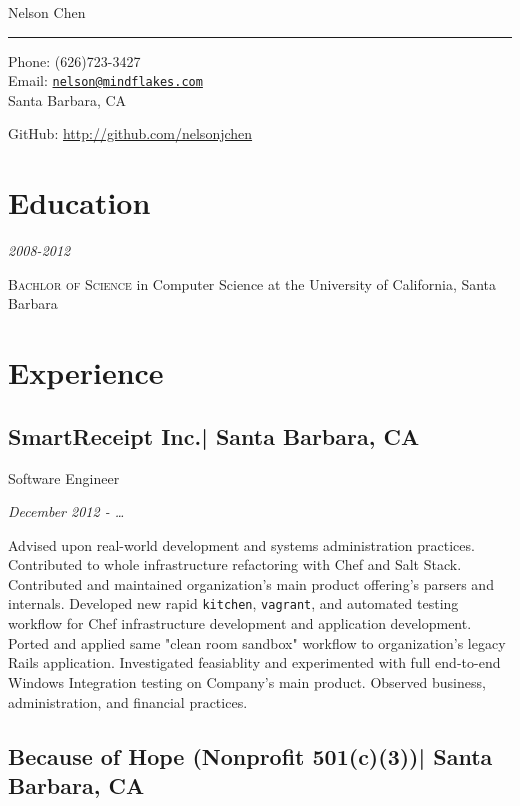 \documentclass[10pt, letter]{article}
\makeatletter
\def\myname{Nelson Chen}
\def\myemail{nelson@mindflakes.com}
\def\mycellphone{(626)723-3427}
\def\myaddress{Santa Barbara, CA}
\def\mygithub{nelsonjchen}
\newcommand{\years}[1]{\marginnote{#1}}
\renewcommand{\years}[1]{{\emph{#1}}}
\makeatother
\begin{document}
{\LARGE \myname}\\
\hrule
\begin{multicols}{2}
{Phone: \mycellphone}\\[.01cm]
{Email: \href{mailto:\myemail}{\texttt{\myemail}}}\\[.05cm]
\myaddress

{GitHub: \href{http://www.github.com/\mygithub}{http://github.com/\mygithub}}

\section*{Education}

\years{2008-2012}

\textsc{Bachlor of Science} in Computer Science at the University of California, Santa Barbara

\section*{Experience}

\subsection*{SmartReceipt Inc.| {\footnotesize{Santa Barbara, CA}}}

Software Engineer

\years{December 2012 - \ldots}

Advised upon real-world development and systems administration practices.
Contributed to whole infrastructure refactoring with Chef and Salt Stack.
Contributed and maintained organization's main product offering's parsers and
internals.  Developed new rapid \texttt{kitchen}, \texttt{vagrant}, and
automated testing workflow for Chef infrastructure development and application
development. Ported and applied same "clean room sandbox" workflow to
organization's legacy Rails application. Investigated feasiablity and
experimented with full end-to-end Windows Integration testing on Company's main
product. Observed business, administration, and financial practices.


\subsection*{Because of Hope (Nonprofit 501(c)(3))| {\footnotesize{Santa Barbara, CA}}}


\end{multicols}
\end{document}

